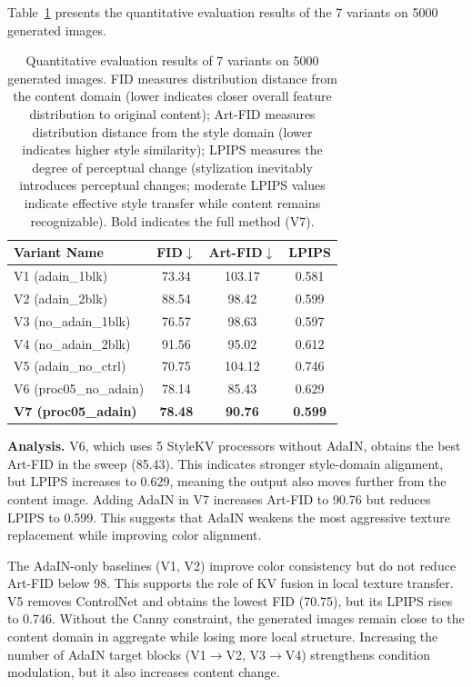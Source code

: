 \documentclass[10pt,twocolumn]{article}
\begin{document}
Table~\ref{tab:quant_results} presents the quantitative evaluation results of the 7 variants on 5000 generated images.

\begin{table}[htbp]
  \centering
  \caption{Quantitative evaluation results of 7 variants on 5000 generated images. FID measures distribution distance from the content domain (lower indicates closer overall feature distribution to original content); Art-FID measures distribution distance from the style domain (lower indicates higher style similarity); LPIPS measures the degree of perceptual change (stylization inevitably introduces perceptual changes; moderate LPIPS values indicate effective style transfer while content remains recognizable). Bold indicates the full method (V7).}
  \label{tab:quant_results}
  \small
  \setlength{\tabcolsep}{3pt}
  \begin{tabular}{lccc}
    \toprule
    Variant Name & FID$\downarrow$ & Art-FID$\downarrow$ & LPIPS \\
    \midrule
    V1 (adain\_1blk)       & 73.34 & 103.17 & 0.581 \\
    V2 (adain\_2blk)       & 88.54 & 98.42  & 0.599 \\
    V3 (no\_adain\_1blk)   & 76.57 & 98.63  & 0.597 \\
    V4 (no\_adain\_2blk)   & 91.56 & 95.02  & 0.612 \\
    V5 (adain\_no\_ctrl)   & 70.75 & 104.12 & 0.746 \\
    V6 (proc05\_no\_adain) & 78.14 & 85.43  & 0.629 \\
    \textbf{V7 (proc05\_adain)} & \textbf{78.48} & \textbf{90.76} & \textbf{0.599} \\
    \bottomrule
  \end{tabular}
\end{table}

\textbf{Analysis.} V6, which uses 5 StyleKV processors without AdaIN, obtains the best Art-FID in the sweep (85.43). This indicates stronger style-domain alignment, but LPIPS increases to 0.629, meaning the output also moves further from the content image. Adding AdaIN in V7 increases Art-FID to 90.76 but reduces LPIPS to 0.599. This suggests that AdaIN weakens the most aggressive texture replacement while improving color alignment.

The AdaIN-only baselines (V1, V2) improve color consistency but do not reduce Art-FID below 98. This supports the role of KV fusion in local texture transfer. V5 removes ControlNet and obtains the lowest FID (70.75), but its LPIPS rises to 0.746. Without the Canny constraint, the generated images remain close to the content domain in aggregate while losing more local structure. Increasing the number of AdaIN target blocks (V1$\to$V2, V3$\to$V4) strengthens condition modulation, but it also increases content change.
\end{document}
